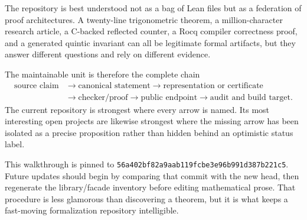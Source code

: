 \documentclass[
  10pt,
  a4paper,
  twoside,
  open=any,
  parskip=half,
  headings=big
]{scrreprt}
\newcommand{\CommitFull}{56a402bf82a9aab119fcbe3e96b991d387b221c5}
\begin{document}
The repository is best understood not as a bag of Lean files but as a federation of proof architectures. A twenty-line trigonometric theorem, a million-character research article, a C-backed reflected counter, a Rocq compiler correctness proof, and a generated quintic invariant can all be legitimate formal artifacts, but they answer different questions and rely on different evidence.

The maintainable unit is therefore the complete chain
\[
\begin{aligned}
  \text{source claim}
    &\longrightarrow \text{canonical statement}
     \longrightarrow \text{representation or certificate} \\
    &\longrightarrow \text{checker/proof}
     \longrightarrow \text{public endpoint}
     \longrightarrow \text{audit and build target}.
\end{aligned}
\]
The current repository is strongest where every arrow is named. Its most interesting open projects are likewise strongest where the missing arrow has been isolated as a precise proposition rather than hidden behind an optimistic status label.

This walkthrough is pinned to \texttt{\CommitFull}. Future updates should begin by comparing that commit with the new head, then regenerate the library/facade inventory before editing mathematical prose. That procedure is less glamorous than discovering a theorem, but it is what keeps a fast-moving formalization repository intelligible.
\end{document}
